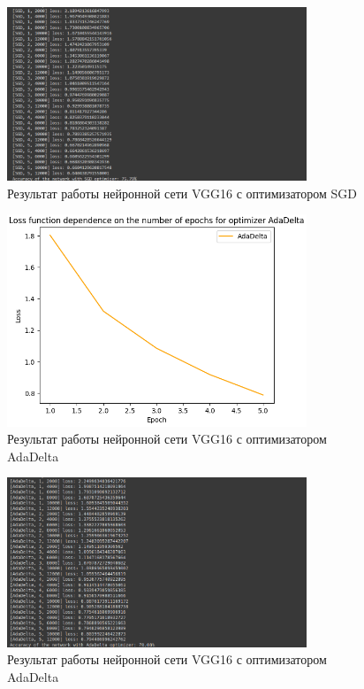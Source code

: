 \documentclass[a4paper, 14pt]{extarticle}
\begin{document}
\begin{figure}[!htb]
	\centering
	\includegraphics[width=0.8\textwidth]{img5}
\caption{Результат работы нейронной сети VGG16 с оптимизатором SGD}
\label{fig:img5}
\end{figure}

\begin{figure}[!htb]
	\centering
	\includegraphics[width=0.8\textwidth]{img6}
\caption{Результат работы нейронной сети VGG16 с оптимизатором AdaDelta}
\label{fig:img6}
\end{figure}

\begin{figure}[!htb]
	\centering
	\includegraphics[width=0.8\textwidth]{img7}
\caption{Результат работы нейронной сети VGG16 с оптимизатором AdaDelta}
\label{fig:img7}
\end{figure}
\end{document}
